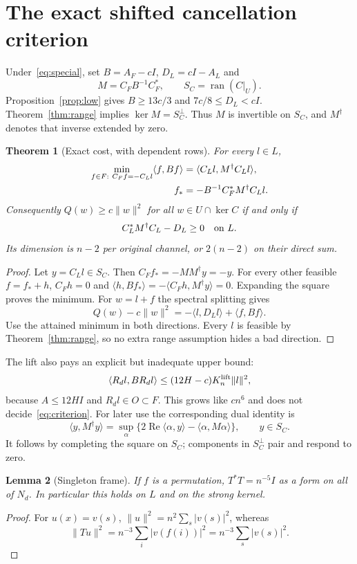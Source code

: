 \documentclass[11pt]{article}
\newcommand{\norm}[1]{\lVert#1\rVert}
\newcommand{\ip}[2]{\langle#1,#2\rangle}
\DeclareMathOperator{\ran}{ran}
\DeclareMathOperator{\Rea}{Re}
\newtheorem{theorem}{Theorem}[section]
\newtheorem{lemma}[theorem]{Lemma}
\theoremstyle{definition}
\theoremstyle{remark}
\begin{document}
\section{The exact shifted cancellation criterion}\label{sec:cost}
Under~\eqref{eq:special}, set $B=A_F-cI$, $D_L=cI-A_L$ and
\[
 M=C_FB^{-1}C_F^*,\qquad S_C=\ran(C|_U).
\]
Proposition~\ref{prop:low} gives $B\ge13c/3$ and $7c/8\le D_L<cI$.
Theorem~\ref{thm:range} implies $\ker M=S_C^\perp$. Thus $M$ is invertible
on $S_C$, and $M^\dagger$ denotes that inverse extended by zero.

\begin{theorem}[Exact cost, with dependent rows]\label{thm:cost}
For every $l\in L$,
\begin{align}\label{eq:mincost}
 \min_{f\in F:\ C_Ff=-C_Ll}\ip f{Bf}
       &=\ip{C_Ll}{M^\dagger C_Ll},\\
 f_*&=-B^{-1}C_F^*M^\dagger C_Ll.\notag
\end{align}
Consequently $Q(w)\ge c\norm w^2$ for all $w\in U\cap\ker C$ if and only if
\begin{equation}\label{eq:criterion}
                  C_L^*M^\dagger C_L-D_L\ge0\quad\hbox{on }L.
\end{equation}
Its dimension is $n-2$ per original channel, or $2(n-2)$ on their direct sum.
\end{theorem}
\begin{proof}
Let $y=C_Ll\in S_C$. Then $C_Ff_*=-MM^\dagger y=-y$. For every other
feasible $f=f_*+h$, $C_Fh=0$ and
$\ip h{Bf_*}=-\ip{C_Fh}{M^\dagger y}=0$. Expanding the square proves
the minimum. For $w=l+f$ the spectral splitting gives
\[
        Q(w)-c\norm w^2=-\ip l{D_Ll}+\ip f{Bf}.
\]
Use the attained minimum in both directions. Every $l$ is feasible by
Theorem~\ref{thm:range}, so no extra range assumption hides a bad direction.
\end{proof}

The lift also pays an explicit but inadequate upper bound:
\[
 \ip{R_dl}{BR_dl}\le(12H-c)K_n^{\rm lift}\norm l^2,
\]
because
$A\le12HI$ and $R_dl\in O\subset F$. This grows like $cn^6$ and does not
decide~\eqref{eq:criterion}.
For later use the corresponding dual identity is
\begin{equation}\label{eq:dual}
 \ip y{M^\dagger y}
   =\sup_\alpha\{2\Rea\ip\alpha y-\ip\alpha{M\alpha}\},\qquad y\in S_C.
\end{equation}
It follows by completing the square on $S_C$; components in $S_C^\perp$
pair and respond to zero.

\begin{lemma}[Singleton frame]\label{lem:frame}
If $f$ is a permutation, $T^*T=n^{-5}I$ as a form on all of $N_d$.
In particular this holds on $L$ and on the strong kernel.
\end{lemma}
\begin{proof}
For $u(x)=v(s)$, $\norm u^2=n^2\sum_s|v(s)|^2$, whereas
\[
 \norm{Tu}^2=n^{-3}\sum_i|v(f(i))|^2=n^{-3}\sum_s|v(s)|^2.
\]
\end{proof}
\end{document}
